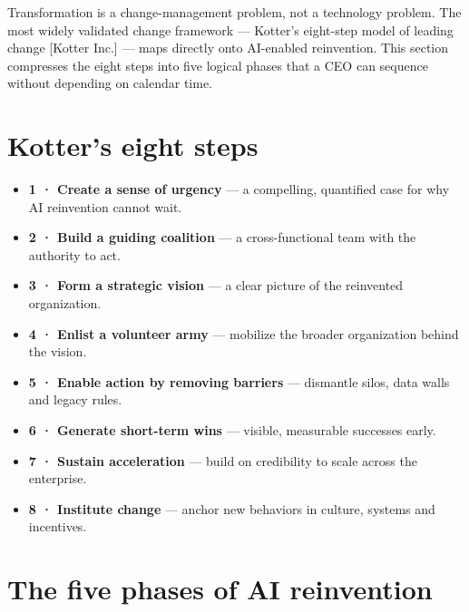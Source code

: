 
Transformation is a change-management problem, not a technology problem. The
most widely validated change framework — Kotter's eight-step model of leading
change [Kotter Inc.] — maps directly onto AI-enabled reinvention. This section
compresses the eight steps into five logical phases that a CEO can sequence
without depending on calendar time.

\section{Kotter's eight steps}

\begin{itemize}
  \item \textbf{1 · Create a sense of urgency} — a compelling, quantified case for why AI reinvention cannot wait.
  \item \textbf{2 · Build a guiding coalition} — a cross-functional team with the authority to act.
  \item \textbf{3 · Form a strategic vision} — a clear picture of the reinvented organization.
  \item \textbf{4 · Enlist a volunteer army} — mobilize the broader organization behind the vision.
  \item \textbf{5 · Enable action by removing barriers} — dismantle silos, data walls and legacy rules.
  \item \textbf{6 · Generate short-term wins} — visible, measurable successes early.
  \item \textbf{7 · Sustain acceleration} — build on credibility to scale across the enterprise.
  \item \textbf{8 · Institute change} — anchor new behaviors in culture, systems and incentives.
\end{itemize}

\section{The five phases of AI reinvention}

